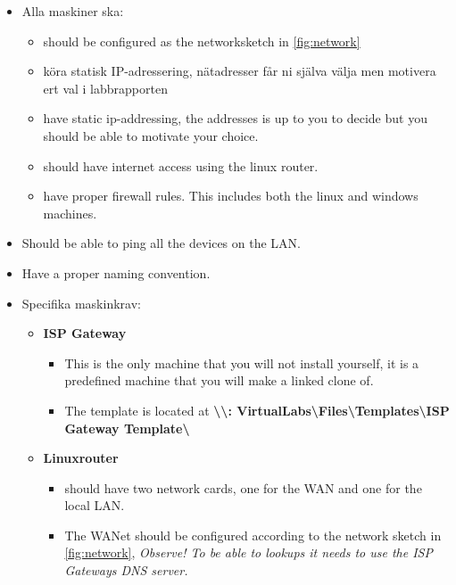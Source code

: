 \documentclass[paper=a4, fontsize=11pt]{report} %
\begin{document}
\begin{itemize}
    \item Alla maskiner ska:
    \begin{itemize}
        \item should be configured as the networksketch in \figurename \ref{fig:network}
        \item köra statisk IP-adressering, nätadresser får ni själva välja men motivera ert val i labbrapporten
        \item have static ip-addressing, the addresses is up to you to decide but you should be able to motivate your choice. 
		\item should have internet access using the linux router.
        \item have proper firewall rules. This includes both the linux and windows machines.
    \end{itemize}
    \item Should be able to ping all the devices on the LAN.
    \item Have a proper naming convention.
	\item Specifika maskinkrav:
    \begin{itemize}
        \item \textbf{ISP Gateway}
        \begin{itemize}
            
			\item This is the only machine that you will not install yourself, it is a predefined machine that you will make a linked clone of.
            \item The template is located at \textbf{\textbackslash\textbackslash: VirtualLabs\textbackslash Files\textbackslash Templates\textbackslash ISP Gateway Template\textbackslash }
        \end{itemize}

        \item \textbf{Linuxrouter}
        \begin{itemize}
			\item should have two network cards, one for the WAN and one for the local LAN.
            \item The WANet should be configured according to the network sketch in \figurename \ref{fig:network}, \textit{Observe! To be able to lookups it needs to use the ISP Gateways DNS server.}
			
        \end{itemize}
    \end{itemize}
\end{itemize}
\end{document}

